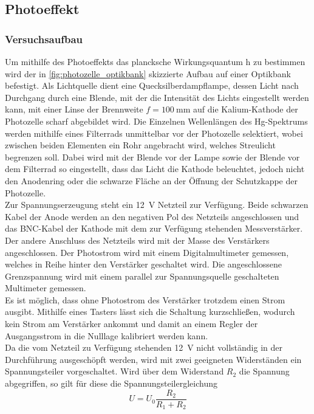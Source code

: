 \subsection{Photoeffekt}
\subsubsection{Versuchsaufbau}
Um mithilfe des Photoeffekts das plancksche Wirkungsquantum h zu bestimmen wird der
in \cref{fig:photozelle_optikbank} skizzierte Aufbau auf einer Optikbank befestigt.
Als Lichtquelle dient eine Quecksilberdampflampe, dessen Licht nach Durchgang durch eine
Blende, mit der die Intensität des Lichts eingestellt werden kann,
mit einer Linse der Brennweite $f=\SI{100}{\milli\meter}$ auf die Kalium-Kathode
der Photozelle scharf abgebildet wird. Die Einzelnen Wellenlängen des Hg-Spektrums
werden mithilfe eines Filterrads unmittelbar vor der Photozelle selektiert,
wobei zwischen beiden Elementen ein Rohr angebracht wird, welches Streulicht
begrenzen soll. Dabei wird mit der Blende vor der Lampe sowie der Blende vor
dem Filterrad so eingestellt, dass das Licht die Kathode beleuchtet, jedoch nicht
den Anodenring oder die schwarze Fläche an der Öffnung der Schutzkappe der Photozelle.\\

Zur Spannungserzeugung steht ein \SI{12}{\volt} Netzteil zur Verfügung. Beide schwarzen
Kabel der Anode werden an den negativen Pol des Netzteils angeschlossen und
das BNC-Kabel der Kathode mit dem zur Verfügung stehenden Messverstärker.
Der andere Anschluss des Netzteils wird mit der Masse des Verstärkers angeschlossen.
Der Photostrom wird mit einem Digitalmultimeter gemessen, welches in Reihe hinter
den Verstärker geschaltet wird.
Die angeschlossene Grenzspannung wird mit einem parallel zur Spannungsquelle
geschalteten Multimeter gemessen.\\

Es ist möglich, dass ohne Photostrom des Verstärker trotzdem einen Strom ausgibt.
Mithilfe eines Tasters lässt sich die Schaltung kurzschließen, wodurch kein Strom
am Verstärker ankommt und damit an einem Regler der Ausgangsstrom in die Nulllage
kalibriert werden kann.\\

Da die vom Netzteil zu Verfügung stehenden \SI{12}{\volt} nicht vollständig in der Durchführung
ausgeschöpft werden, wird mit zwei geeigneten Widerständen ein Spannungsteiler
vorgeschaltet. Wird über dem Widerstand $R_2$ die Spannung abgegriffen, so gilt für diese
die Spannungsteilergleichung
\begin{equation}
	U = U_0\frac{R_2}{R_1 + R_2}
	\label{eq:spannungsteiler}
\end{equation}




